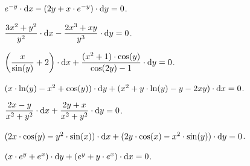 \begin{problem}
	$e^{-y} \cdot \mathop{}\!\mathrm{d} x - (2 y + x \cdot e^{-y}) \cdot \mathop{}\!\mathrm{d} y = 0$.
\end{problem}

\begin{problem}
	$\dfrac{3 x^2 + y^2}{y^2} \cdot \mathop{}\!\mathrm{d} x - \dfrac{2 x^3 + x y}{y^3} \cdot \mathop{}\!\mathrm{d} y = 0$.
\end{problem}

\begin{problem}
	$\left( \dfrac{x}{\sin (y)} + 2 \right) \cdot \mathop{}\!\mathrm{d} x + \dfrac{(x^2 + 1) \cdot \cos (y)}{\cos (2 y) - 1} \cdot \mathop{}\!\mathrm{d} y = 0$.
\end{problem}

\begin{problem}
	$(x \cdot \ln (y) - x^2 + \cos (y)) \cdot \mathop{}\!\mathrm{d} y + (x^2 + y \cdot \ln (y) - y - 2 x y) \cdot \mathop{}\!\mathrm{d} x = 0$.
\end{problem}

\begin{problem}
	$\dfrac{2 x - y}{x^2 + y^2} \cdot \mathop{}\!\mathrm{d} x + \dfrac{2 y + x}{x^2 + y^2} \cdot \mathop{}\!\mathrm{d} y = 0$.
\end{problem}

\begin{problem}
	$(2 x \cdot \cos (y) - y^2 \cdot \sin (x)) \cdot \mathop{}\!\mathrm{d} x + (2 y \cdot \cos (x) - x^2 \cdot \sin (y)) \cdot \mathop{}\!\mathrm{d} y = 0$.
\end{problem}

\begin{problem}
	$(x \cdot e^y + e^x) \cdot \mathop{}\!\mathrm{d} y + (e^y + y \cdot e^x) \cdot \mathop{}\!\mathrm{d} x = 0$.
\end{problem}
